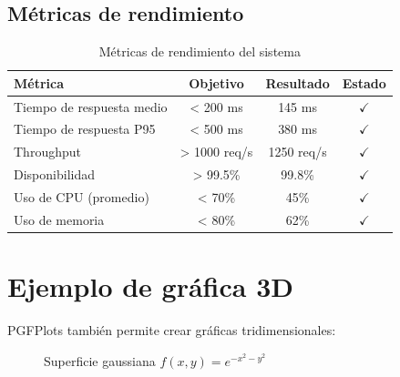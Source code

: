 \subsection{Métricas de rendimiento}
\label{subsec:metricas-rendimiento}

\begin{table}[htbp]
  \centering
  \caption{Métricas de rendimiento del sistema}
  \label{tab:metricas}
  \EPScabeceraTabla
  \begin{tabular}{@{}lccc@{}}
    \toprule
    \textbf{Métrica} & \textbf{Objetivo} & \textbf{Resultado} & \textbf{Estado} \\
    \midrule
    Tiempo de respuesta medio & < 200 ms & 145 ms & \textcolor{green!60!black}{\ensuremath{\checkmark}} \\
    Tiempo de respuesta P95 & < 500 ms & 380 ms & \textcolor{green!60!black}{\ensuremath{\checkmark}} \\
    Throughput & > 1000 req/s & 1250 req/s & \textcolor{green!60!black}{\ensuremath{\checkmark}} \\
    Disponibilidad & > 99.5\% & 99.8\% & \textcolor{green!60!black}{\ensuremath{\checkmark}} \\
    Uso de CPU (promedio) & < 70\% & 45\% & \textcolor{green!60!black}{\ensuremath{\checkmark}} \\
    Uso de memoria & < 80\% & 62\% & \textcolor{green!60!black}{\ensuremath{\checkmark}} \\
    \bottomrule
  \end{tabular}
\end{table}

\section{Ejemplo de gráfica 3D}
\label{sec:grafica-3d}

PGFPlots también permite crear gráficas tridimensionales:

\begin{figure}[htbp]
  \centering
  \caption{Superficie gaussiana $f(x,y) = e^{-x^2-y^2}$}
  \label{fig:3d}
\end{figure}

